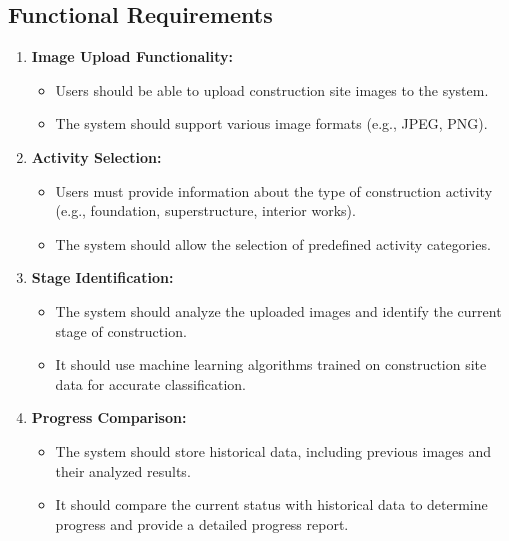 \subsection{Functional Requirements}
\begin{enumerate}
    \item \textbf{Image Upload Functionality:}
    \begin{itemize}
        \item Users should be able to upload construction site images to the system.
        \item The system should support various image formats (e.g., JPEG, PNG).
    \end{itemize}
    \item \textbf{Activity Selection:}
    \begin{itemize}
        \item Users must provide information about the type of construction activity (e.g., foundation, superstructure, interior works).
        \item The system should allow the selection of predefined activity categories.
    \end{itemize}
    \item \textbf{Stage Identification:}
    \begin{itemize}
        \item The system should analyze the uploaded images and identify the current stage of construction.
        \item It should use machine learning algorithms trained on construction site data for accurate classification.
    \end{itemize}
    \item \textbf{Progress Comparison:}
    \begin{itemize}
        \item The system should store historical data, including previous images and their analyzed results.
        \item It should compare the current status with historical data to determine progress and provide a detailed progress report.
    \end{itemize}
\end{enumerate}

